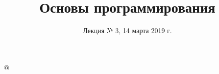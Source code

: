%





\title{Основы программирования}
\subtitle{Лекция № 3, 14 марта 2019 г.}
\date{}




\lstMakeShortInline[style=inlineC]@

\begin{frame}[plain]
  \titlepage
\end{frame}


\newcommand\memtop{1}
\newcommand\membottom{0}

\newcommand{\memline}[2]{
  \def\left{#1-0.45}
  \def\right{#2+0.45}

  \draw[byte lines] (\left,\membottom) grid (\right,\memtop);

  \foreach \y in {\membottom, \memtop}
    \draw (\left,\y) -- (\right,\y);

  \foreach \x in {\left, \right}
    \draw [decorate,decoration={snake,amplitude=0.3mm,segment length=3mm}]
      (\x,\membottom) -- (\x,\memtop);
}

\newcommand{\memblock}[3]{
  \def\left{#1}
  \def\right{#2}
  \def\blockname{#3}

  \draw [mem block,draw=none] (\left,\membottom) rectangle (\right,\memtop);
  \draw [block byte lines] (\left,\membottom) grid (\right,\memtop);
  \draw [mem block,fill=none] (\left,\membottom) rectangle (\right,\memtop)
    node [pos=0.5] (block \blockname) {};
}

\newcommand{\memaddr}[2]{
  \def\x{#1+0.5}
  \def\y{\membottom-0.5}
  \draw [-latex,shorten <=6pt] (\x,\y)
    node [fill=white,inner sep=0,outer sep=0] {\ttfamily\small #2} -- (\x,\membottom);
}

\newcommand{\memlabel}[3]{
  \path (#1,\memtop) -- (#2,\memtop)
    node [midway,yshift=3mm,text height=1.5ex] {\ttfamily #3};
}

